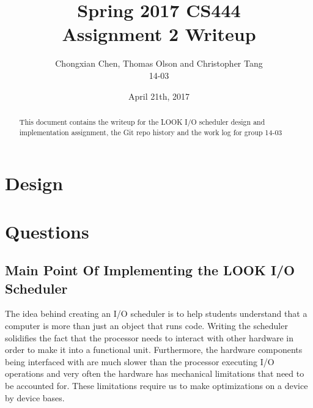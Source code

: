 \documentclass[10pt,onecolumn,journal,draftclsnofoot,letterpaper]{IEEEtran}
\begin{document}
\begin{titlepage}
  \title{Spring 2017 CS444\\Assignment 2 Writeup}
  \author{Chongxian Chen, Thomas Olson and Christopher Tang\\14-03}
  \date{April 21th, 2017}
  \maketitle
  \vspace{4cm}
  \begin{abstract}
  \noindent This document contains the writeup for the LOOK I/O scheduler design and implementation assignment, the Git repo history and the work log for group 14-03
 \end{abstract}
    \bigskip
    \bigskip
    \bigskip
    \bigskip
    \bigskip



\end{titlepage}

\section{Design}

\section{Questions}

\subsection{Main Point Of Implementing the LOOK I/O Scheduler}
The idea behind creating an I/O scheduler is to help students understand that a computer is more than just an object that runs code. Writing the scheduler solidifies the fact that the processor needs to interact with other hardware in order to make it into a functional unit. Furthermore, the hardware components being interfaced with are much slower than the processor executing I/O operations and very often the hardware has mechanical limitations that need to be accounted for. These limitations require us to make optimizations on a device by device bases.
\end{document}

